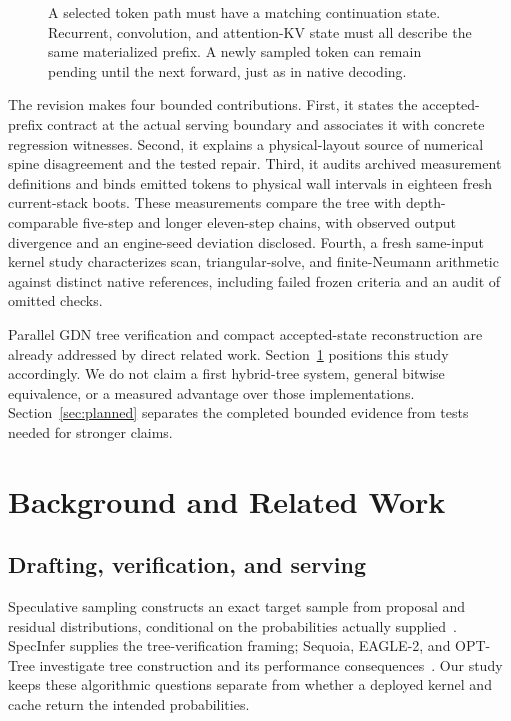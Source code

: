 \documentclass[conference]{IEEEtran}
\begin{document}
\begin{figure}[t]
\centering

\caption{A selected token path must have a matching continuation state. Recurrent, convolution, and attention-KV state must all describe the same materialized prefix. A newly sampled token can remain pending until the next forward, just as in native decoding.}
\label{fig:contract}
\end{figure}

The revision makes four bounded contributions. First, it states the accepted-prefix contract at the actual serving boundary and associates it with concrete regression witnesses. Second, it explains a physical-layout source of numerical spine disagreement and the tested repair. Third, it audits archived measurement definitions and binds emitted tokens to physical wall intervals in eighteen fresh current-stack boots. These measurements compare the tree with depth-comparable five-step and longer eleven-step chains, with observed output divergence and an engine-seed deviation disclosed. Fourth, a fresh same-input kernel study characterizes scan, triangular-solve, and finite-Neumann arithmetic against distinct native references, including failed frozen criteria and an audit of omitted checks.

Parallel GDN tree verification and compact accepted-state reconstruction are already addressed by direct related work. Section~\ref{sec:related} positions this study accordingly. We do not claim a first hybrid-tree system, general bitwise equivalence, or a measured advantage over those implementations. Section~\ref{sec:planned} separates the completed bounded evidence from tests needed for stronger claims.

\section{Background and Related Work}
\label{sec:related}
\subsection{Drafting, verification, and serving}
Speculative sampling constructs an exact target sample from proposal and residual distributions, conditional on the probabilities actually supplied~\cite{leviathan2023fast,chen2023sampling}. SpecInfer supplies the tree-verification framing; Sequoia, EAGLE-2, and OPT-Tree investigate tree construction and its performance consequences~\cite{miao2023specinfer,chen2024sequoia,li2024eagle,wang2024opt}. Our study keeps these algorithmic questions separate from whether a deployed kernel and cache return the intended probabilities.
\end{document}
